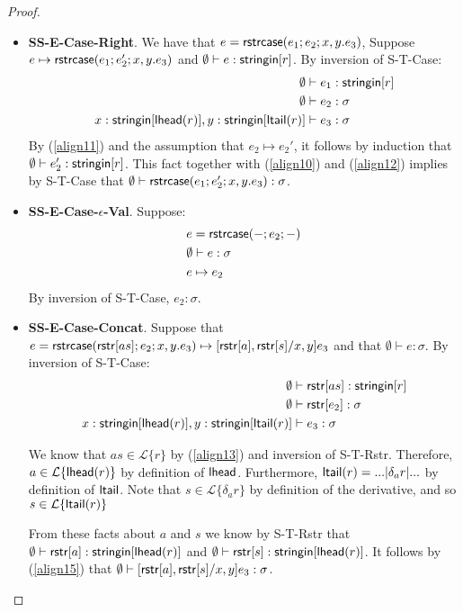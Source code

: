 \documentclass[12pt]{article}
\theoremstyle{definition}
\newcommand{\Lagr}{\mathcal{L}}
\newcommand{\lang}[1]{\Lagr\{#1\}}
\newcommand{\stringin}[1]{{\sf stringin}[#1]}
\newcommand{\strcase}[3]{ {\sf rstrcase}(#1; #2; #3)}
\newcommand{\lhead}[1]{ {\sf lhead}(#1) }
\newcommand{\ltail}[1]{ {\sf ltail}(#1) }
\begin{document}
\begin{proof}
\begin{itemize}[label=$ $,itemsep=1ex]
\item \textbf{SS-E-Case-Right}. 
We have that $e = \strcase{e_1}{e_2}{x,y.e_3}$, Suppose $e \mapsto \strcase{e_1}{e_2'}{x,y.e_3}$
and $\emptyset \vdash e : \stringin{r}$.
By inversion of S-T-Case:
\begin{align}
\emptyset&\vdash e_1 : \stringin{r} \label{align10}\\
\emptyset&\vdash e_2 : \sigma \label{align11} \\ 
x:\stringin{\lhead{r}}, y : \stringin{\ltail{r}} &\vdash e_3 : \sigma \label{align12}
\end{align}
By (\ref{align11}) and the assumption that $e_2 \mapsto e_2'$, it follows by induction that $\emptyset\vdash e_2' : \stringin{r}$.
This fact together with (\ref{align10}) and (\ref{align12}) implies by S-T-Case that 
$\emptyset\vdash\strcase{e_1}{e_2'}{x,y.e_3} : \sigma$.

\item \textbf{SS-E-Case-$\epsilon$-Val}.
Suppose: \begin{align*}
&e = \strcase{-}{e_2}{-} \\
&\emptyset\vdash e: \sigma \\
&e \mapsto e_2
\end{align*}
By inversion of S-T-Case, $e_2 : \sigma$.

\item \textbf{SS-E-Case-Concat}.
Suppose that $e = \strcase{\rstr{as}}{e_2}{x,y.e_3} \mapsto [\rstr{a}, \rstr{s} / x,y] e_3$
and that $\emptyset\vdash e : \sigma$.
By inversion of S-T-Case:
\begin{align}
\emptyset&\vdash \rstr{as} : \stringin{r} \label{align13}\\
\emptyset&\vdash \rstr{e_2} : \sigma \label{align14} \\ 
x:\stringin{\lhead{r}}, y : \stringin{\ltail{r}} &\vdash e_3 : \sigma \label{align15}
\end{align}

We know that $as \in \lang{r}$ by (\ref{align13}) and inversion of S-T-Rstr.
Therefore, $a \in \lang{\lhead{r}}$ by definition of ${\sf lhead}$.
Furthermore, $\ltail{r} = ... | \delta_a{r} | ...$ by definition of ${\sf ltail}$.
Note that $s \in \lang{\delta_a{r}}$ by definition of the derivative, and so
$s \in \lang{\ltail{r}}$

From these facts about $a$ and $s$ we know by S-T-Rstr that $\emptyset\vdash \rstr{a} : \stringin{\lhead{r}}$
and $\emptyset\vdash \rstr{s} : \stringin{\lhead{r}}$.
It follows by (\ref{align15}) that  $\emptyset\vdash [{\sf rstr}[a], {\sf rstr}[s] / x,y] e_3 : \sigma$.


\end{itemize}
\end{proof}
\end{document}
